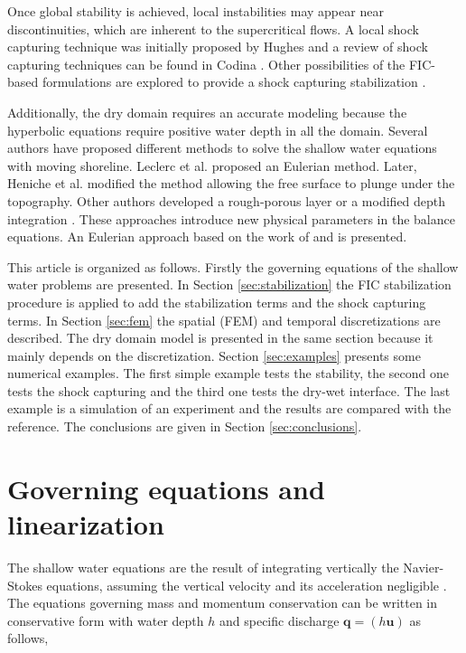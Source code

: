 \documentclass[a4paper,12pt]{elsarticle}
\begin{document}
Once global stability is achieved, local instabilities may appear near discontinuities, which are inherent to the supercritical flows.
A local shock capturing technique was initially proposed by Hughes \cite{hughes1986} and a review of shock capturing techniques can be found in Codina \cite{codina2011}.
Other possibilities of the FIC-based formulations are explored to provide a shock capturing stabilization \cite{cotela2016}.

Additionally, the dry domain requires an accurate modeling because the hyperbolic equations require positive water depth in all the domain.
Several authors have proposed different methods to solve the shallow water equations with moving shoreline. Leclerc et al. \cite{leclerc1990} proposed an Eulerian method. Later, Heniche et al. \cite{heniche2000} modified the method allowing the free surface to plunge under the topography.
Other authors developed a rough-porous layer \cite{candy2017,barros2011} or a modified depth integration \cite{defina2000}. These approaches introduce new physical parameters in the balance equations.
An Eulerian approach based on the work of \cite{leclerc1990} and \cite{heniche2000} is presented.


This article is organized as follows. Firstly the governing equations of the shallow water problems are presented.
In Section \ref{sec:stabilization} the FIC stabilization procedure is applied to add the stabilization terms and the shock capturing terms.
In Section \ref{sec:fem} the spatial (FEM) and temporal discretizations are described.
The dry domain model is presented in the same section because it mainly depends on the discretization.
Section \ref{sec:examples} presents some numerical examples.
The first simple example tests the stability, the second one tests the shock capturing and the third one tests the dry-wet interface.
The last example is a simulation of an experiment and the results are compared with the reference.
The conclusions are given in Section \ref{sec:conclusions}.


\section{Governing equations and linearization}

The shallow water equations are the result of integrating vertically the Navier-Stokes equations, assuming the vertical velocity and its acceleration negligible \cite{abbot1979,zien3}.
The equations governing mass and momentum conservation can be written in conservative form with water depth $h$ and specific discharge $\mathbf{q}=(h\mathbf{u})$ as follows,
\end{document}
